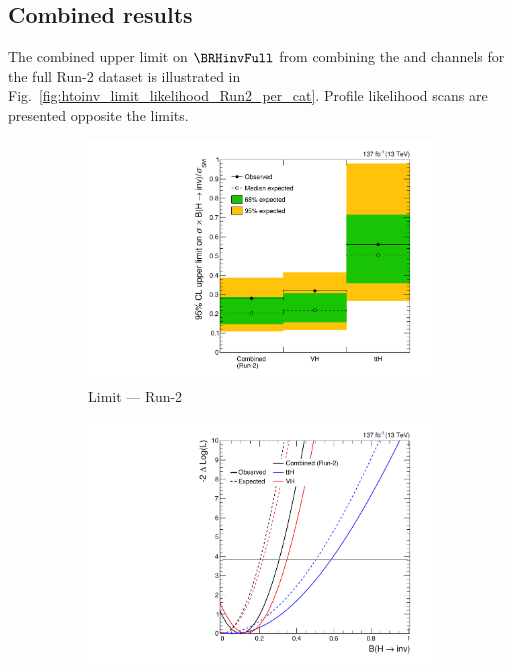 

\subsection{Combined results}
\label{subsec:htoinv_combined_results}

The combined upper limit on $\BRHinvFull$ from combining the \ttH and \VH channels for the full Run-2 dataset is illustrated in Fig.~\ref{fig:htoinv_limit_likelihood_Run2_per_cat}. Profile likelihood scans are presented opposite the limits.

\begin{figure}[htbp]
    \centering
    \begin{subfigure}[t]{0.48\textwidth}  %
        \includegraphics[width=\textwidth]{figures/limits/full_Run2/limit_Run2_comb_per_cat.pdf}
        \caption{Limit --- Run-2}
    \end{subfigure}
    \hfill
    \begin{subfigure}[t]{0.48\textwidth}
        \includegraphics[width=\textwidth]{figures/likelihood_scan/profile_likelihood_scan_Run2_per_cat.pdf}

\end{subfigure}
\end{figure}
